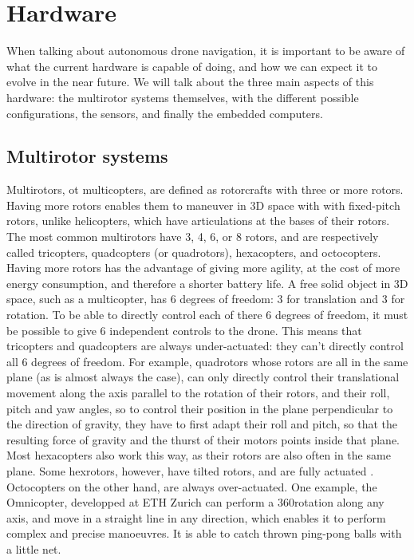 \section{Hardware}
When talking about autonomous drone navigation, it is important to be aware of what the current hardware is capable of doing, and how we can expect it to evolve in the near future. We will talk about the three main aspects of this hardware: the multirotor systems themselves, with the different possible configurations, the sensors, and finally the embedded computers.

\subsection{Multirotor systems}
Multirotors, ot multicopters, are defined as rotorcrafts with three or more rotors. Having more rotors enables them to maneuver in 3D space with with fixed-pitch rotors, unlike helicopters, which have articulations at the bases of their rotors. The most common multirotors have 3, 4, 6, or 8 rotors, and are respectively called tricopters, quadcopters (or quadrotors), hexacopters, and octocopters. Having more rotors has the advantage of giving more agility, at the cost of more energy consumption, and therefore a shorter battery life. A free solid object in 3D space, such as a multicopter, has 6 degrees of freedom: 3 for translation and 3 for rotation. To be able to directly control each of there 6 degrees of freedom, it must be possible to give 6 independent controls to the drone. This means that tricopters and quadcopters are always under-actuated: they can't directly control all 6 degrees of freedom.
For example, quadrotors whose rotors are all in the same plane (as is almost always the case), can only directly control their translational movement along the axis parallel to the rotation of their rotors, and their roll, pitch and yaw angles, so to control their position in the plane perpendicular to the direction of gravity, they have to first adapt their roll and pitch, so that the resulting force of gravity and the thurst of their motors points inside that plane. Most hexacopters also work this way, as their rotors are also often in the same plane. Some hexrotors, however, have tilted rotors, and are fully actuated \cite{dexteroushexrotor}. \\
Octocopters on the other hand, are always over-actuated. One example, the Omnicopter, developped at ETH Zurich \cite{omnidirectionalav} can perform a 360\degree  rotation along any axis, and move in a straight line in any direction, which enables it to perform complex and precise manoeuvres. It is able to catch thrown ping-pong balls with a little net.

